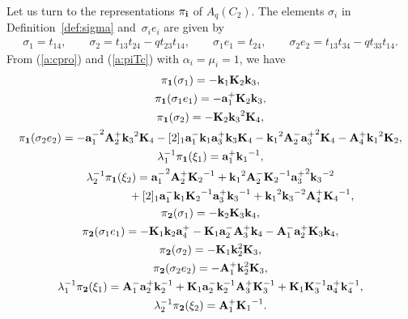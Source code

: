 Let us turn to the representations $\pi_{{\bf i}}$ of $A_q(C_2)$.
The elements $\sigma_i$ in Def\/inition~\ref{def:sigma}
and~$\sigma_ie_i$
are given by
\begin{gather}\label{c:kobetsu}
\sigma_1 = t_{14}, \qquad
\sigma_2 = t_{13}t_{24}-qt_{23}t_{14},\qquad
\sigma_1 e_1 = t_{24},\qquad
\sigma_2e_2 = t_{13}t_{34}-qt_{33}t_{14}.
\end{gather}
From (\ref{a:cpro}) and (\ref{a:piTc}) with $\alpha_i=\mu_i=1$, we have
\begin{gather*}
\pi_{\bf 1}(\sigma_1)=- {{\bf k}_1}
{{\bf K}_2} {{\bf k}_3},\\
\pi_{\bf 1}(\sigma_1e_1)=- {{\bf a}^+_1}
{{\bf K}_2} {{\bf k}_3},\\
\pi_{\bf 1}(\sigma_2)=- {{\bf K}_2}
{{\bf k}_3}^{2} {{\bf K}_4},\\
\pi_{\bf 1}(\sigma_2e_2)=- {{\bf a}^-_1}^2
{{\bf A}^+_2} {{\bf k}_3}^{2} {{\bf K}_4}
-[2]_1 {{\bf a}^-_1} {{\bf k}_1}
{{\bf a}^+_3} {{\bf k}_3} {{\bf K}_4}
- {{\bf k}_1}^{2} {{\bf A}^-_2} {{\bf a}^+_3}^2
{{\bf K}_4}
- {{\bf A}^+_4} {{\bf k}_1}^{2} {{\bf K}_2},\\
\lambda_1^{-1}\pi_{\bf 1}(\xi_1)={{\bf a}^
+_1} {{\bf k}_1}^{-1},\\
\lambda_2^{-1}\pi_{\bf 1}(\xi_2) ={{\bf a}^-
_1}^2 {{\bf A}^+_2} {{\bf K}_2}^{-1}
+{{\bf k}_1}^{2} {{\bf A}^-_2} {{\bf K}_2}^{-1}
{{\bf a}^+_3}^2 {{\bf k}_3}^{-2}\\
\hphantom{\lambda_2^{-1}\pi_{\bf 1}(\xi_2) =}{}
+[2]_1 {{\bf a}^-_1} {{\bf k}_1}
{{\bf K}_2}^{-1} {{\bf a}^+_3} {{\bf k}_3}^{-1}
+{{\bf k}_1}^{2} {{\bf k}_3}^{-2} {{\bf A}^+_4}
{{\bf K}_4}^{-1},\\
\pi_{\bf 2}(\sigma_1)=- {\bf k}_2 {\bf
K}_3 {\bf k}_4,\\
\pi_{\bf 2}(\sigma_1e_1) =- {{\bf K}_1}
{\bf k}_2 {{\bf a}^+_4}
- {{\bf K}_1} {{\bf a}^-_2} {{\bf A}^+_3} {\bf
k}_4
- {{\bf A}^-_1} {{\bf a}^+_2} {\bf K}_3 {\bf k}
_4,\\
\pi_{\bf 2}(\sigma_2)=- {{\bf K}_1}
{\bf k}_2^2 {\bf K}_3,\\
\pi_{\bf 2}(\sigma_2e_2)=- {{\bf A}^+_1}
{\bf k}_2^2 {\bf K}_3,\\
\lambda_1^{-1}\pi_{\bf 2}(\xi_1)={{\bf A}^-
_1} {{\bf a}^+_2} {\bf k}_2^{-1}
+{{\bf K}_1} {{\bf a}^-_2} {\bf k}_2^{-1}
{{\bf A}^+_3} {\bf K}_3^{-1}
+{{\bf K}_1} {\bf K}_3^{-1} {{\bf a}^+_4} {\bf
k}_4^{-1},\\
\lambda_2^{-1}\pi_{\bf 2}(\xi_2)={{\bf A}^
+_1} {{\bf K}_1}^{-1}.
\end{gather*}

